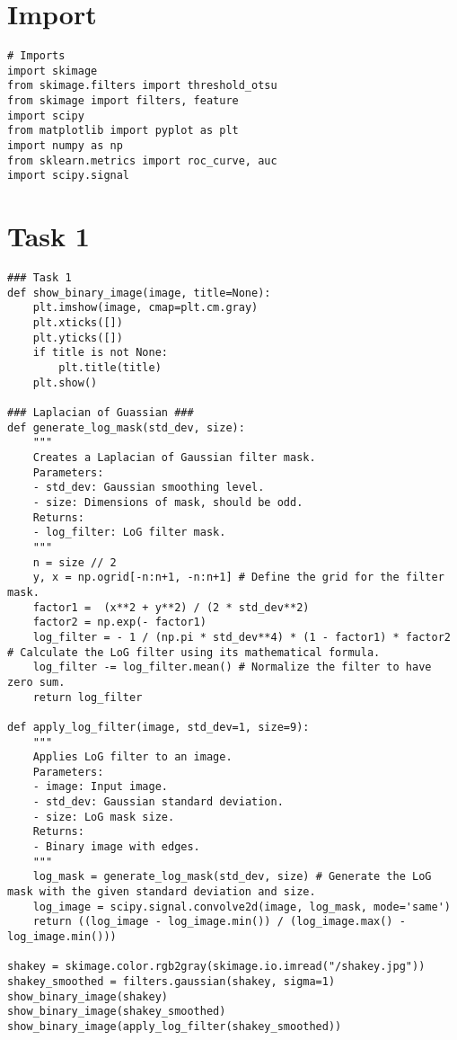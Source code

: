 \documentclass[11pt]{article}
\begin{document}
\section*{Import}

\begin{lstlisting}
# Imports
import skimage
from skimage.filters import threshold_otsu
from skimage import filters, feature
import scipy
from matplotlib import pyplot as plt
import numpy as np
from sklearn.metrics import roc_curve, auc
import scipy.signal
\end{lstlisting}

\section*{Task 1}

\begin{lstlisting}
### Task 1
def show_binary_image(image, title=None):
    plt.imshow(image, cmap=plt.cm.gray)
    plt.xticks([])
    plt.yticks([])
    if title is not None:
        plt.title(title)
    plt.show()
    
### Laplacian of Guassian ###
def generate_log_mask(std_dev, size):
    """
    Creates a Laplacian of Gaussian filter mask.
    Parameters:
    - std_dev: Gaussian smoothing level.
    - size: Dimensions of mask, should be odd.
    Returns:
    - log_filter: LoG filter mask.
    """
    n = size // 2
    y, x = np.ogrid[-n:n+1, -n:n+1] # Define the grid for the filter mask.
    factor1 =  (x**2 + y**2) / (2 * std_dev**2)
    factor2 = np.exp(- factor1)
    log_filter = - 1 / (np.pi * std_dev**4) * (1 - factor1) * factor2 # Calculate the LoG filter using its mathematical formula.
    log_filter -= log_filter.mean() # Normalize the filter to have zero sum.
    return log_filter

def apply_log_filter(image, std_dev=1, size=9):
    """
    Applies LoG filter to an image.
    Parameters:
    - image: Input image.
    - std_dev: Gaussian standard deviation.
    - size: LoG mask size.
    Returns:
    - Binary image with edges.
    """
    log_mask = generate_log_mask(std_dev, size) # Generate the LoG mask with the given standard deviation and size.
    log_image = scipy.signal.convolve2d(image, log_mask, mode='same')
    return ((log_image - log_image.min()) / (log_image.max() - log_image.min()))

shakey = skimage.color.rgb2gray(skimage.io.imread("/shakey.jpg"))
shakey_smoothed = filters.gaussian(shakey, sigma=1)
show_binary_image(shakey)
show_binary_image(shakey_smoothed)
show_binary_image(apply_log_filter(shakey_smoothed))
\end{lstlisting}
\end{document}
